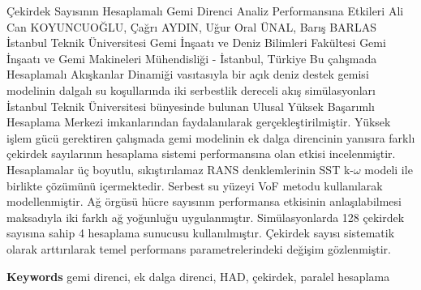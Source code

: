 
    \begin{abstract_online}{Çekirdek Sayısının Hesaplamalı Gemi Direnci Analiz Performansına Etkileri}{%
        Ali Can KOYUNCUOĞLU, Çağrı AYDIN, Uğur Oral ÜNAL, Barış BARLAS}{%
        }{%
        İstanbul Teknik Üniversitesi Gemi İnşaatı ve Deniz Bilimleri Fakültesi Gemi İnşaatı ve Gemi Makineleri Mühendisliği - İstanbul, Türkiye}
    Bu çalışmada Hesaplamalı Akışkanlar Dinamiği vasıtasıyla bir açık deniz destek gemisi modelinin dalgalı su koşullarında iki serbestlik dereceli akış simülasyonları İstanbul Teknik Üniversitesi bünyesinde bulunan Ulusal Yüksek Başarımlı Hesaplama Merkezi imkanlarından faydalanılarak gerçekleştirilmiştir. Yüksek işlem gücü gerektiren çalışmada gemi modelinin ek dalga direncinin yanısıra farklı çekirdek sayılarının hesaplama sistemi performansına olan etkisi incelenmiştir. Hesaplamalar üç boyutlu, sıkıştırılamaz RANS denklemlerinin SST k-$\omega$ modeli ile birlikte çözümünü içermektedir. Serbest su yüzeyi VoF metodu kullanılarak modellenmiştir. Ağ örgüsü hücre sayısının performansa etkisinin anlaşılabilmesi maksadıyla iki farklı ağ yoğunluğu uygulanmıştır. Simülasyonlarda 128 çekirdek sayısına sahip 4 hesaplama sunucusu kullanılmıştır. Çekirdek sayısı sistematik olarak arttırılarak temel performans parametrelerindeki değişim gözlenmiştir. 
    
        \textbf{Keywords} \newline{}gemi direnci, ek dalga direnci, HAD, çekirdek, paralel hesaplama
    \end{abstract_online}
    